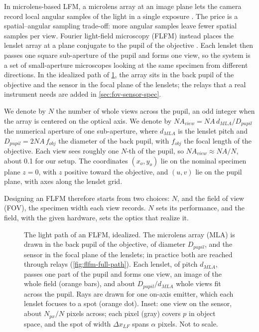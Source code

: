 In microlens-based LFM, a microlens array at an image plane lets the camera record local angular samples of the light in a single exposure \cite{levoy2006lightFieldMicroscopy,levoy2009recordingControlling4d,broxton2013waveOpticsLfm}. The price is a spatial--angular sampling trade-off: more angular samples leave fewer spatial samples per view. Fourier light-field microscopy (FLFM) instead places the lenslet array at a plane conjugate to the pupil of the objective \cite{guo2019fourierLightField}. Each lenslet then passes one square sub-aperture of the pupil and forms one view, so the system is a set of small-aperture microscopes looking at the same specimen from different directions. In the idealized path of \cref{fig:flfm-path}, the array sits in the back pupil of the objective and the sensor in the focal plane of the lenslets; the relays that a real instrument needs are added in \cref{sec:fov-sensor-spec}.

We denote by $N$ the number of whole views across the pupil, an odd integer when the array is centered on the optical axis. We denote by $NA_{view}=NA\,d_{MLA}/D_{pupil}$ the numerical aperture of one sub-aperture, where $d_{MLA}$ is the lenslet pitch and $D_{pupil}=2NA\,f_{obj}$ the diameter of the back pupil, with $f_{obj}$ the focal length of the objective. Each view sees roughly one $N$-th of the pupil, so $NA_{view}\approx NA/N$, about 0.1 for our setup. The coordinates $(x_o,y_o)$ lie on the nominal specimen plane $z=0$, with $z$ positive toward the objective, and $(u,v)$ lie on the pupil plane, with axes along the lenslet grid.

Designing an FLFM therefore starts from two choices: $N$, and the field of view (FOV), the specimen width each view records. $N$ sets its performance, and the field, with the given hardware, sets the optics that realize it.

\begin{figure}[tbp]
    \centering
    
    \caption{The light path of an FLFM, idealized. The microlens array (MLA) is drawn in the back pupil of the objective, of diameter $D_{pupil}$, and the sensor in the focal plane of the lenslets; in practice both are reached through relays (\cref{fig:flfm-full-path}). Each lenslet, of pitch $d_{MLA}$, passes one part of the pupil and forms one view, an image of the whole field (orange bars), and about $D_{pupil}/d_{MLA}$ whole views fit across the pupil. Rays are drawn for one on-axis emitter, which each lenslet focuses to a spot (orange dot). Inset: one view on the sensor, about $N_{px}/N$ pixels across; each pixel (gray) covers $p$ in object space, and the spot of width $\Delta x_{LF}$ spans $\alpha$ pixels. Not to scale.}
    \label{fig:flfm-path}
\end{figure}


